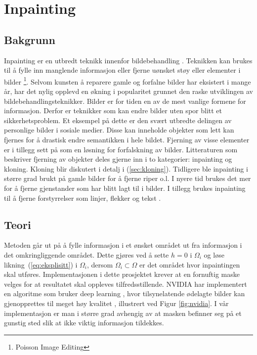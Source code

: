 \section{Inpainting}
\label{sec:Inpainting}
\subsection{Bakgrunn}
Inpainting er en utbredt teknikk innenfor bildebehandling \cite{wiki:inpainting}. Teknikken kan brukes til å fylle inn manglende informasjon eller fjerne uønsket støy eller elementer i bilder \footnote{Poisson Image Editing\cite{papers0171:online}}. Selvom kunsten å reparere gamle og forfalne bilder har eksistert i mange år, har det nylig opplevd en økning i popularitet grunnet den raske utviklingen av bildebehandlingsteknikker. Bilder er for tiden en av de mest vanlige formene for informasjon. Derfor er teknikker som kan endre bilder uten spor blitt et sikkerhetsproblem. Et eksempel på dette er den svært utbredte delingen av personlige bilder i sosiale medier. Disse kan inneholde objekter som lett kan fjernes for å drastisk endre semantikken i hele bildet. Fjerning av visse elementer er i tillegg sett på som en løsning for forfalskning av bilder. Litteraturen som beskriver fjerning av objekter deles gjerne inn i to kategorier: inpainting og kloning. Kloning blir diskutert i detalj i (\ref{sec:kloning}). Tidligere ble inpainting i større grad brukt på gamle bilder for å fjerne riper o.l. I nyere tid brukes det mer for å fjerne gjenstander som har blitt lagt til i bilder. I tillegg brukes inpainting til å fjerne forstyrrelser som linjer, flekker og tekst \cite{1909063938:online}.

\subsection{Teori}
 Metoden går ut på å fylle informasjon i et ønsket området ut fra informasjon i det omkringliggende området. Dette gjøres ved å sette $h=0$ i $\Omega_i$ og løse likning~(\ref{eq:eksplisitt}) i $\Omega_i$, dersom $\Omega_i \subset \Omega$ er det området hvor inpaintingen skal utføres. Implementasjonen i dette prosjektet krever at en fornuftig maske velges for at resultatet skal oppleves tilfredsstillende. NVIDIA har implementert en algoritme som bruker deep learning \cite{wiki:Deep_learning}, hvor tilsynelatende ødelagte bilder kan gjenopprettes til meget høy kvalitet \cite{180407722:nvidia}, illustrert ved Figur \ref{fig:nvidia}. I vår implementasjon er man i større grad avhengig av at masken befinner seg på et gunstig sted slik at ikke viktig informasjon tildekkes.
 
